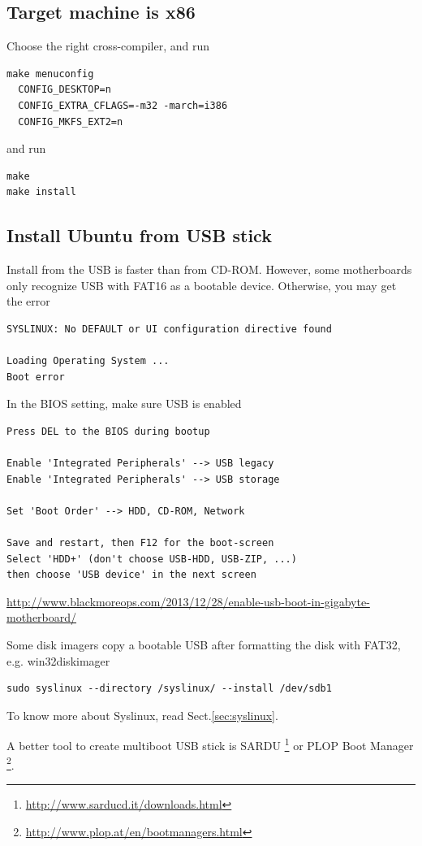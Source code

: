 \subsection{Target machine is x86}

Choose the right cross-compiler, and run
\begin{verbatim}
make menuconfig
  CONFIG_DESKTOP=n
  CONFIG_EXTRA_CFLAGS=-m32 -march=i386
  CONFIG_MKFS_EXT2=n
\end{verbatim}
and run
\begin{verbatim}
make
make install
\end{verbatim}

\subsection{Install Ubuntu from USB stick}

Install from the USB is faster than from CD-ROM. However, some motherboards only
recognize USB with FAT16 as a bootable device. Otherwise, you may get the error

\begin{verbatim}
SYSLINUX: No DEFAULT or UI configuration directive found

Loading Operating System ...
Boot error
\end{verbatim}

In the BIOS setting, make sure USB is enabled
\begin{verbatim}
Press DEL to the BIOS during bootup

Enable 'Integrated Peripherals' --> USB legacy
Enable 'Integrated Peripherals' --> USB storage

Set 'Boot Order' --> HDD, CD-ROM, Network

Save and restart, then F12 for the boot-screen
Select 'HDD+' (don't choose USB-HDD, USB-ZIP, ...)
then choose 'USB device' in the next screen
\end{verbatim}
\url{http://www.blackmoreops.com/2013/12/28/enable-usb-boot-in-gigabyte-motherboard/}

Some disk imagers copy a bootable USB after formatting the disk with FAT32, e.g.
win32diskimager 


\begin{verbatim}
sudo syslinux --directory /syslinux/ --install /dev/sdb1
\end{verbatim}

To know more about Syslinux, read Sect.\ref{sec:syslinux}.


A better tool to create multiboot USB stick is SARDU
\footnote{\url{http://www.sarducd.it/downloads.html}} or PLOP Boot Manager
\footnote{\url{http://www.plop.at/en/bootmanagers.html}}.

